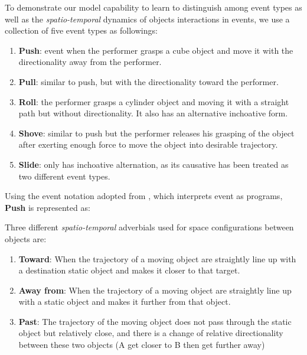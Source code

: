 \documentclass{esann}
\begin{document}
To demonstrate our model capability to learn to distinguish among event types as well as  the \textit{spatio-temporal} dynamics of objects interactions in events, we use a collection of five event types as followings:
\begin{enumerate}
    \item \textbf{Push}: event when the performer grasps a cube object and move it with the directionality away from the performer.
    \item \textbf{Pull}: similar to push, but with the directionality toward the performer.
    \item \textbf{Roll}: the performer grasps a cylinder object and moving it with a straight path but without directionality. It also has an alternative inchoative form.
    \item \textbf{Shove}: similar to push but the performer releases his grasping of the object after exerting enough force to move the object into desirable trajectory.
    \item \textbf{Slide}: only has inchoative alternation, as its causative has been treated as two different event types.
\end{enumerate}

Using the event notation adopted from \cite{PUSTEJOVSKY16.1101}, which interprets event as programs, \textbf{Push} is represented as:


Three different \textit{spatio-temporal} adverbials used for space configurations between objects are:
\begin{enumerate}
    \item \textbf{Toward}: When the trajectory of a moving object are straightly line up with a destination static object and makes it closer to that target.
    \item \textbf{Away from}: When the trajectory of a moving object are straightly line up with a static object and makes it further from that object. 
    \item \textbf{Past}: The trajectory of the moving object does not pass through the static object but relatively close, and there is a change of relative directionality between these two objects (A get closer to B then get further away)
\end{enumerate}

\fi

\end{document}

